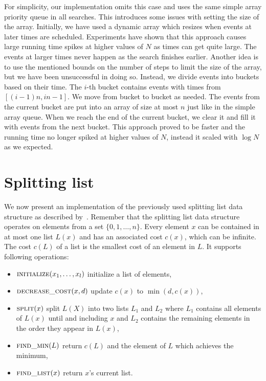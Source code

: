 For simplicity, our implementation omits this case and uses the same simple array priority queue in all searches. This introduces some issues with setting the size of the array. Initially, we have used a dynamic array which resizes when events at later times are scheduled. Experiments have shown that this approach causes large running time spikes at higher values of $N$ as times can get quite large. The events at larger times never happen as the search finishes earlier. Another idea is to use the mentioned bounds on the number of steps to limit the size of the array, but we have been unsuccessful in doing so. Instead, we divide events into buckets based on their time. The $i$-th bucket contains events with times from $[(i-1)n, in-1]$. We move from bucket to bucket as needed. The events from the current bucket are put into an array of size at most $n$ just like in the simple array queue. When we reach the end of the current bucket, we clear it and fill it with events from the next bucket. This approach proved to be faster and the running time no longer spiked at higher values of $N$, instead it scaled with $\log N$ as we expected.

\section{Splitting list}

We now present an implementation of the previously used splitting list data structure as described by~\cite{gabow1985scaling}. Remember that the splitting list data structure operates on elements from a set $\{0, 1, \dots, n\}$. Every element $x$ can be contained in at most one list $L(x)$ and has an associated cost $c(x)$, which can be infinite. The cost $c(L)$ of a list is the smallest cost of an element in $L$. It supports following operations:

\begin{itemize}
    \item $\textsc{initialize}(x_1, \dots, x_l)$ initialize a list of elements,
    \item $\textsc{decrease\_cost}(x, d)$ update $c(x)$ to $\min(d, c(x))$,
    \item $\textsc{split}(x)$ split $L(X)$ into two lists $L_1$ and $L_2$ where $L_1$ contains all elements of $L(x)$ until and including $x$ and $L_2$ contains the remaining elements in the order they appear in $L(x)$,
    \item $\textsc{find\_min}(L)$ return $c(L)$ and the element of $L$ which achieves the minimum,
    \item $\textsc{find\_list}(x)$ return $x$'s current list.
\end{itemize}

